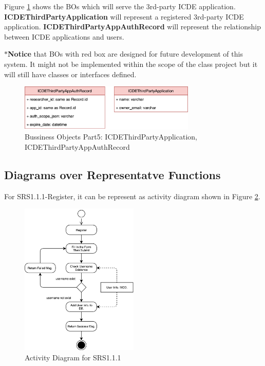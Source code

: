 Figure \ref{fig:bo_classes_6} shows the BOs which will serve the 3rd-party ICDE application.
\textbf{ICDEThirdPartyApplication} will represent a registered 3rd-party ICDE application.
\textbf{ICDEThirdPartyAppAuthRecord} will represent the relationship between ICDE applications and users.

\textbf{$\ast$Notice} that BOs with {\color{OrangeRed} red box} are designed for future development of this system. It might not be implemented within the scope of the class project but it will still have classes or interfaces defined.

\begin{figure}[t]
	\centering
	\includegraphics[width=0.75\textwidth]{./img/bo_classes_6.png}
	\caption{Bussiness Objects Part5: ICDEThirdPartyApplication, ICDEThirdPartyAppAuthRecord}

	\label{fig:bo_classes_6}
\end{figure}

\subsection{Diagrams over Representatve Functions}

For SRS1.1.1-Register, it can be represent as activity diagram shown in Figure \ref{fig:srs_diagram_1}.

\begin{figure}[t]
	\centering
	\includegraphics[width=0.5\textwidth]{./img/srs_diagram_1.png}
	\caption{Activity Diagram for SRS1.1.1}
	\label{fig:srs_diagram_1}
\end{figure}

